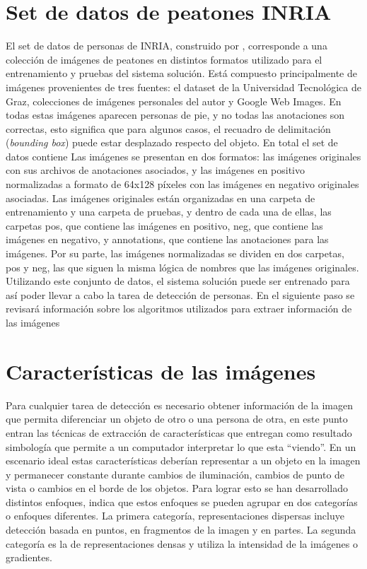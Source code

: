 \section{Set de datos de peatones INRIA}
\label{preliminares:deteccion}

El set de datos de personas de INRIA, construido por \cite{dalal2005}, corresponde a una colección de imágenes de peatones en distintos formatos utilizado para el entrenamiento y pruebas del sistema solución. Está compuesto principalmente de imágenes provenientes de tres fuentes: el dataset de la Universidad Tecnológica de Graz, colecciones de imágenes personales del autor y Google Web Images. En todas estas imágenes aparecen personas de pie, y no todas las anotaciones son correctas, esto significa que para algunos casos, el recuadro de delimitación (\textit{bounding box}) puede estar desplazado respecto del objeto. En total el set de datos  contiene 
Las imágenes se presentan en dos formatos: las imágenes originales con sus archivos de anotaciones asociados, y las imágenes en positivo normalizadas a formato de 64x128 píxeles con las imágenes en negativo originales asociadas. Las imágenes originales están organizadas en una carpeta de entrenamiento y una carpeta de pruebas, y dentro de cada una de ellas, las carpetas pos, que contiene las imágenes en positivo, neg, que contiene las imágenes en negativo, y annotations, que contiene las anotaciones para las imágenes. Por su parte, las imágenes normalizadas se dividen en dos carpetas, pos y neg, las que siguen la misma lógica de nombres que las imágenes originales.
Utilizando este conjunto de datos, el sistema solución puede ser entrenado para así poder llevar a cabo la tarea de detección de personas. En el siguiente paso se revisará información sobre los algoritmos utilizados para extraer información de las imágenes

\section{Características de las imágenes}
\label{preliminares:caract}

Para cualquier tarea de detección es necesario obtener información de la imagen que permita diferenciar un objeto de otro o una persona de otra, en este punto entran las técnicas de extracción de características que entregan como resultado simbología que permite a un computador interpretar lo que esta ``viendo''. En un escenario ideal estas características deberían representar a un objeto en la imagen y permanecer constante durante cambios de iluminación, cambios de punto de vista o cambios en el borde de los objetos. Para lograr esto se han desarrollado distintos enfoques, \cite{dalal2006} indica que estos enfoques se pueden agrupar en dos categorías o enfoques diferentes. La primera categoría, representaciones dispersas incluye detección basada en puntos, en fragmentos de la imagen y en partes. La segunda categoría es la de representaciones densas y utiliza la intensidad de la imágenes o gradientes.

